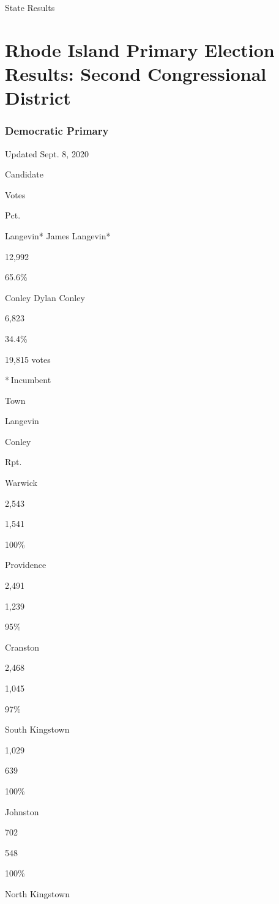  State Results

\hypertarget{rhode-island-primary-election-results-second-congressional-district-1}{%
\section{Rhode Island Primary Election Results: Second Congressional
District}\label{rhode-island-primary-election-results-second-congressional-district-1}}

\hypertarget{democratic-primary}{%
\subsubsection{Democratic Primary}\label{democratic-primary}}

Updated Sept. 8, 2020

Candidate

Votes

Pct.

 Langevin* James Langevin*

12,992

65.6\%

 Conley Dylan Conley

6,823

34.4\%

19,815 votes

* Incumbent

Town

Langevin

Conley

Rpt.

Warwick

2,543

1,541

100\%

Providence

2,491

1,239

95\%

Cranston

2,468

1,045

97\%

South Kingstown

1,029

639

100\%

Johnston

702

548

100\%

North Kingstown

